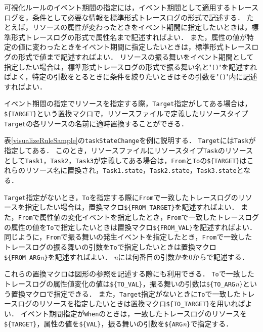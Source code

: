 \begin{description}
{\begin{description}
    \end{description}
}
\end{description}

可視化ルールのイベント期間の指定には，イベント期間として適用するトレースログを，条件として必要な情報を標準形式トレースログの形式で記述する．
たとえば，リソースの属性が変わったときをイベント期間に指定したいときは，標準形式トレースログの形式で属性名まで記述すればよい．
また，属性の値が特定の値に変わったときをイベント期間に指定したいときは，標準形式トレースログの形式で値まで記述すればよい．
リソースの振る舞いをイベント期間として指定したい場合は，標準形式トレースログの形式で振る舞い名と"{\tt ()}"を記述すればよく，特定の引数をとるときに条件を絞りたいときはその引数を"{\tt ()}"内に記述すればよい．

イベント期間の指定でリソースを指定する際，{\tt Target}指定がしてある場合は，\verb|${TARGET}|という置換マクロで，リソースファイルで定義したリソースタイプ{\tt Target}の各リソースの名前に適時置換することができる．

表\ref{visualizeRuleSample}の{\tt taskStateChange}を例に説明する．
{\tt Target}には{\tt Task}が指定してある．
このとき，リソースファイルにリソースタイプ{\tt Task}のリソースとして{\tt Task1}，{\tt Task2}，{\tt Task3}が定義してある場合は，{\tt From}と{\tt To}の\verb|${TARGET}|はこれらのリソース名に置換され，{\tt Task1.state}，{\tt Task2.state}，{\tt Task3.state}となる．

{\tt Target}指定がないとき，{\tt To}を指定する際に{\tt From}で一致したトレースログのリソースを指定したい場合は，置換マクロ\verb|${FROM_TARGET}|を記述すればよい．
また，{\tt From}で属性値の変化イベントを指定したとき，{\tt From}で一致したトレースログの属性の値を{\tt To}で指定したいときは置換マクロ\verb|${FROM_VAL}|を記述すればよい．
同じように，{\tt From}で振る舞いの発生イベントを指定したとき，{\tt From}で一致したトレースログの振る舞いの引数を{\tt To}で指定したいときは置換マクロ\verb|${FROM_ARG|{\it n}\verb|}|を記述すればよい．
{\it n}には何番目の引数かを0からで記述する．

これらの置換マクロは図形の参照を記述する際にも利用できる．
{\tt To}で一致したトレースログの属性値変化の値は\verb|${TO_VAL}|，振る舞いの引数は\verb|${TO_ARG|{\it n}\verb|}|という置換マクロで指定できる．
また，{\tt Target}指定がないときに{\tt To}で一致したトレースログのリソースを指定したいときは置換マクロ\verb|${TO_TARGET}|を用いればよい．
イベント期間指定が{\tt When}のときは，一致したトレースログのリソースを\verb|${TARGET}|，属性の値を\verb|${VAL}|，振る舞いの引数を\verb|${ARG|{\it n}\verb|}|で指定する．


